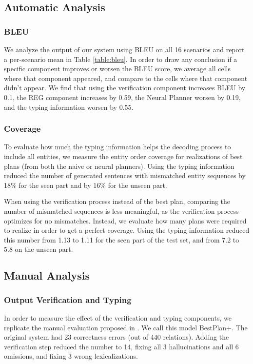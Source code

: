 
\subsection{Automatic Analysis}
\subsubsection{BLEU}
We analyze the output of our system using BLEU \cite{papineni2002bleu} on all 16 scenarios and report a per-scenario mean in Table \ref{table:bleu}.
In order to draw any conclusion if a specific component improves or worsen the BLEU score, we average all cells where that component appeared, and compare to the cells where that component didn't appear.
We find that using the verification component increases BLEU by 0.1, the REG component increases by 0.59, the Neural Planner worsen by 0.19, and the typing information worsen by 0.55.

\subsubsection{Coverage}
To evaluate how much the typing information helps the decoding process to include all entities, we measure the entity order coverage for realizations of best plans (from both the naive or neural planners). Using the typing information reduced the number of generated sentences with mismatched entity sequences by 18\% for the seen part and by 16\% for the unseen part. %

When using the verification process instead of the best plan, comparing the number of mismatched sequences is less meaningful, as the verification process optimizes for no mismatches. Instead, we evaluate how many plans were required to realize in order to get a perfect coverage. Using the typing information reduced this number from 1.13 to 1.11 for the seen part of the test set, and from 7.2 to 5.8 on the unseen part. 


\subsection{Manual Analysis}
\subsubsection{Output Verification and Typing}
In order to measure the effect of the verification and typing components, we replicate the manual evaluation proposed in \citet{step-by-step}. We call this model BestPlan+. The original system had 23 correctness errors (out of 440 relations). Adding the verification step reduced the number to 14, fixing all 3 hallucinations and all 6 omissions, and fixing 3 wrong lexicalizations.   

